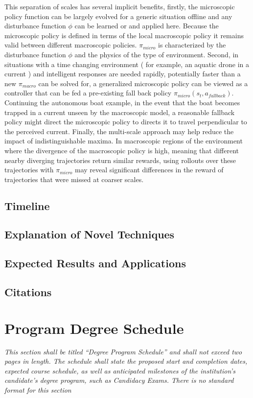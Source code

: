 \documentclass[12pt]{article}
\begin{document}
This separation of scales has several implicit benefits, firstly, the microscopic policy function can be largely evolved for a generic situation offline and any disturbance function $\phi$ can be learned or and applied here. Because the microscopic policy is defined in terms of the local macroscopic policy it remains valid between different macroscopic policies. $\pi_{micro}$ is characterized by the disturbance function $\phi$ and the physics of the type of environment. Second, in situations with a time changing environment ( for example, an aquatic drone in a current ) and intelligent responses are needed rapidly, potentially faster than a new $\pi_{macro}$ can be solved for, a generalized microscopic policy can be viewed as a controller that can be fed a pre-existing fall back policy $\pi_{micro}(s_t,a_{fallback})$. Continuing the autonomous boat example, in the event that the boat becomes trapped in a current unseen by the macroscopic model, a reasonable fallback policy might direct the microscopic policy to directs it to travel perpendicular to the perceived current. Finally, the multi-scale approach may help reduce the impact of indistinguishable maxima. In macroscopic regions of the environment where the divergence of the macroscopic policy is high, meaning that different nearby diverging trajectories return similar rewards, using rollouts over these trajectories with $\pi_{micro}$ may reveal significant differences in the reward of trajectories that were missed at coarser scales.
\subsection{Timeline}
\subsection{Explanation of Novel Techniques}
\subsection{Expected Results and Applications}
\subsection{Citations}
\printbibliography

\newpage
\section{Program Degree Schedule }
\textit{This section shall be titled “Degree Program
Schedule” and shall not exceed two pages in length. The schedule shall state the
proposed start and completion dates, expected course schedule, as well as anticipated
milestones of the institution’s candidate’s degree program, such as Candidacy Exams.
There is no standard format for this section}
\end{document}
